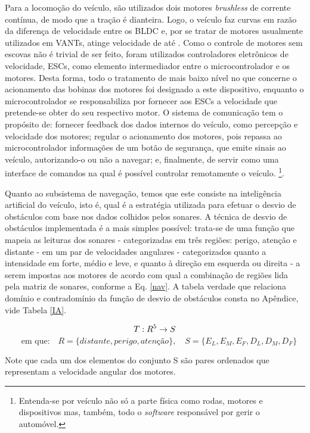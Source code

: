 Para a locomoção do veículo, são utilizados dois motores \textit{brushless} de corrente
contínua, de modo que a tração é dianteira. Logo, o veículo faz curvas em razão da diferença
de velocidade entre os BLDC e, por se tratar de motores usualmente utilizados em VANTs,
atinge velocidade de até  .
Como o controle de motores sem escovas não é trivial de
ser feito, foram utilizados controladores eletrônicos de velocidade, ESCs, como elemento
intermediador entre o microcontrolador e os motores. Desta forma, todo o tratamento de
mais baixo nível no que concerne o acionamento das bobinas dos motores foi designado
a este dispositivo, enquanto o microcontrolador se responsabiliza por fornecer aos ESCs
a velocidade que pretende-se obter do seu respectivo motor.
O sistema de comunicação tem o propósito de: fornecer feedback dos dados internos
do veículo, como percepção e velocidade dos motores; regular o acionamento dos motores,
pois repassa ao microcontrolador informações de um botão de segurança, que emite sinais
ao veículo, autorizando-o ou não a navegar; e, finalmente, de servir como uma interface de
comandos na qual é possível controlar remotamente o veículo.
\footnote{Entenda-se por veículo não só a parte física como rodas, motores e dispositivos mas, também, todo o \textit{software} responsável por gerir 
o automóvel.}.

Quanto ao subsistema de navegação, temos que este consiste na inteligência artificial
do veículo, isto é, qual é a estratégia utilizada para efetuar o desvio de obstáculos com
base nos dados colhidos pelos sonares. A técnica de desvio de obstáculos implementada
é a mais simples possível: trata-se de uma função que mapeia as leituras dos sonares -
categorizadas em três regiões: perigo, atenção e distante - em um par de velocidades
angulares - categorizados quanto a intensidade em forte, médio e leve, e quanto à direção
em esquerda ou direita - a serem impostas aos motores de acordo com qual a combinação
de regiões lida pela matriz de sonares, conforme a Eq. \ref{nav}. A tabela verdade que relaciona
domínio e contradomínio da função de desvio de obstáculos consta no Apêndice, vide Tabela \ref{IA}.

\begin{equation}
\label{nav}
T:R^5 \rightarrow S \\
\end{equation}
$$\quad \textrm{em que:} \quad R=\{distante, perigo, atenção\}, \quad S=\{E_L, E_M, E_F, D_L, D_M, D_F\}$$

Note que cada um dos elementos do conjunto S são pares ordenados que representam a
velocidade angular dos motores.

